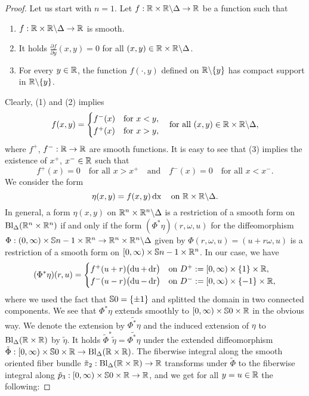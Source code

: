 \documentclass[\MainFolder/Text.tex]{subfiles}
\begin{document}
\begin{proof}
Let us start with $n=1$. Let $f: \mathbb{R}\times \mathbb{R}\backslash\Delta\rightarrow \mathbb{R}$ be a function such that 
\begin{enumerate}
 \item $f: \mathbb{R}\times \mathbb{R}\backslash\Delta\rightarrow \mathbb{R}$ is smooth.
 \item It holds $\frac{\partial f}{\partial y}(x,y) = 0$ for all $(x,y)\in \mathbb{R}\times \mathbb{R}\backslash \Delta$.
 \item For every $y\in \mathbb{R}$, the function $f(\cdot,y)$ defined on $\mathbb{R}\backslash\{y\}$ has compact support in $\mathbb{R}\backslash\{y\}$.
\end{enumerate} 
Clearly, (1) and (2) implies
\begin{equation}\label{Eq:PartialConst}
 f(x,y) = \begin{cases} f^-(x) & \text{for }x<y, \\ f^+(x) & \text{for }x>y, \end{cases}\quad\text{for all }(x,y)\in \mathbb{R}\times \mathbb{R}\backslash \Delta,
\end{equation}
where $f^+$, $f^-: \mathbb{R} \rightarrow \mathbb{R}$ are smooth functions. It is easy to see that (3) implies the existence of $x^+$, $x^-\in \mathbb{R}$ such that 
$$ f^+(x) = 0\quad\text{for all }x>x^+ \quad\text{and}\quad f^-(x) = 0\quad\text{for all }x<x^-. $$
We consider the form
\begin{equation}
\eta(x,y) = f(x,y) \operatorname{dx}\quad\text{on }\mathbb{R}\times\mathbb{R}\backslash\Delta.
\end{equation}
In general, a form $\eta(x,y)$ on $\mathbb{R}^n\times\mathbb{R}^n\backslash\Delta$ is a restriction of a smooth form on $\mathrm{Bl}_\Delta(\mathbb{R}^n\times \mathbb{R}^n)$ if and only if the form $(\Phi^*\eta)(r,\omega,u)$ for the diffeomorphism $\Phi: (0,\infty) \times \mathbb{S}{n-1} \times \mathbb{R}^n \rightarrow \mathbb{R}^n \times \mathbb{R}^n \backslash \Delta$ given by $\Phi(r,\omega,u) = (u+r\omega,u)$ is a restriction of a smooth form on $[0,\infty) \times \mathbb{S}{n-1}\times \mathbb{R}^n$. In our case, we have
$$ (\Phi^*\eta)(r,u) = \begin{cases} 
 f^+(u+r)\bigl(\operatorname{du}+\operatorname{dr}\bigr) & \text{on } D^+:= [0,\infty) \times \{1\}\times \mathbb{R}, \\
 f^-(u-r)\bigl(\operatorname{du}-\operatorname{dr}\bigr) & \text{on }D^-:=[0,\infty) \times \{-1\} \times \mathbb{R}, 
\end{cases} $$
where we used the fact that $\mathbb{S}{0} = \{\pm 1\}$ and splitted the domain in two connected components. We see that $\Phi^* \eta$ extends smoothly to $[0,\infty) \times \mathbb{S}{0}\times \mathbb{R}$ in the obvious way. We denote the extension by $\widetilde{\Phi^* \eta}$ and the induced extension of $\eta$ to $\mathrm{Bl}_\Delta(\mathbb{R}\times \mathbb{R})$ by $\tilde{\eta}$. It holds $\tilde{\Phi}^* \tilde{\eta} = \widetilde{\Phi^* \eta}$ under the extended diffeomorphism $\tilde{\Phi}: [0,\infty) \times \mathbb{S}{0} \times \mathbb{R} \rightarrow \mathrm{Bl}_\Delta(\mathbb{R}\times\mathbb{R})$. The fiberwise integral along the smooth oriented fiber bundle $\tilde{\pi}_2: \mathrm{Bl}_\Delta(\mathbb{R}\times \mathbb{R}) \rightarrow \mathbb{R}$ transforms under $\tilde{\Phi}$ to the fiberwise integral along $\tilde{p}_3: [0,\infty) \times \mathbb{S}{0} \times \mathbb{R} \rightarrow \mathbb{R}$, and we get for all $y=u \in \mathbb{R}$ the following:

\end{proof}
\end{document}
